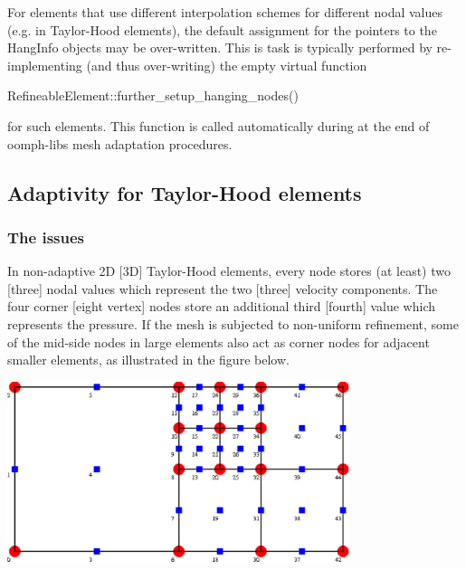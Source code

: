 \begin{DoxyItemize}
\item For elements that use different interpolation schemes for different nodal values (e.\+g. in Taylor-\/\+Hood elements), the default assignment for the pointers to the {\ttfamily Hang\+Info} objects may be over-\/written. This is task is typically performed by re-\/implementing (and thus over-\/writing) the empty virtual function 
\begin{DoxyCode}
RefineableElement::further\_setup\_hanging\_nodes()
\end{DoxyCode}
 for such elements. This function is called automatically during at the end of {\ttfamily oomph-\/lib\textquotesingle{}s} mesh adaptation procedures.
\end{DoxyItemize}\hypertarget{index_refining_TH}{}\subsection{Adaptivity for Taylor-\/\+Hood elements}\label{index_refining_TH}
\hypertarget{index_issues}{}\subsubsection{The issues}\label{index_issues}
In non-\/adaptive 2D \mbox{[}3D\mbox{]} Taylor-\/\+Hood elements, every node stores (at least) two \mbox{[}three\mbox{]} nodal values which represent the two \mbox{[}three\mbox{]} velocity components. The four corner \mbox{[}eight vertex\mbox{]} nodes store an additional third \mbox{[}fourth\mbox{]} value which represents the pressure. If the mesh is subjected to non-\/uniform refinement, some of the mid-\/side nodes in large elements also act as corner nodes for adjacent smaller elements, as illustrated in the figure below.

 
\begin{DoxyImage}
\includegraphics[width=0.75\textwidth]{pressure_hang}
\end{DoxyImage}



